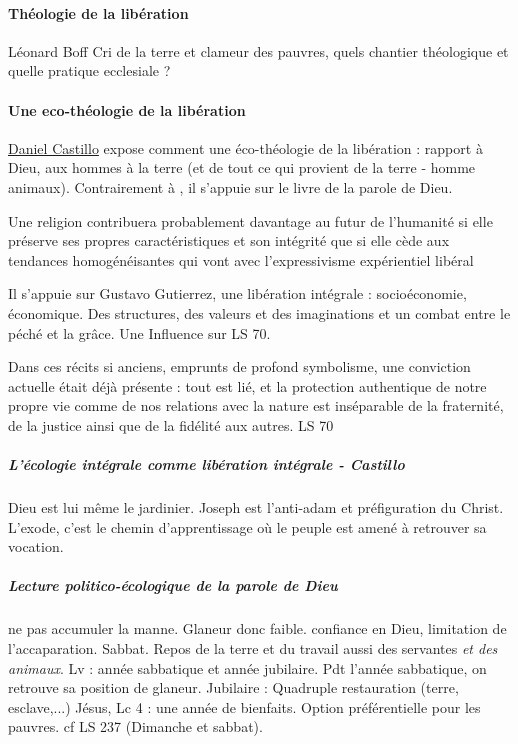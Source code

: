 \paragraph{Théologie de la libération} Léonard Boff
{Cri de la terre et clameur des pauvres, quels chantier théologique et quelle pratique ecclesiale ?} \cite{thomasset_recherche_2020}
 

\paragraph{Une eco-théologie de la libération} 
\href{https://www.loyola.edu/academics/theology/faculty/castillo}{Daniel Castillo} expose comment une éco-théologie  de la libération : rapport à Dieu, aux hommes à la terre (et de tout ce qui provient de la terre - homme animaux). Contrairement à , il s'appuie sur le livre de la parole de Dieu. 
\begin{singlequote}
    Une religion contribuera probablement davantage au futur de l’humanité si elle préserve ses propres caractéristiques et son intégrité que si elle cède aux tendances homogénéisantes qui vont avec l’expressivisme expérientiel libéral \cite[ p. 115]{lindbeck_nature_2002}
\end{singlequote}

Il s'appuie sur Gustavo Gutierrez, une libération intégrale : socioéconomie, économique. Des structures, des valeurs et des imaginations et un combat entre le péché et la grâce. Une Influence sur LS 70.
 
\begin{singlequote}
    Dans ces récits si anciens, emprunts de profond symbolisme, une conviction actuelle était déjà présente : tout est lié, et la protection authentique de notre propre vie comme de nos relations avec la nature est inséparable de la fraternité, de la justice ainsi que de la fidélité aux autres. LS 70
\end{singlequote}
 

\subparagraph{L'écologie intégrale comme libération intégrale - Castillo} 
 Dieu est lui même le jardinier. Joseph est l'anti-adam et préfiguration du Christ.  L'exode, c'est le chemin d'apprentissage où le peuple est amené à retrouver sa vocation. 

\subparagraph{Lecture politico-écologique de la parole de Dieu} ne pas accumuler la manne. Glaneur donc faible. confiance en Dieu, limitation de l'accaparation.
Sabbat. Repos de la terre et du travail aussi des servantes \textit{et des animaux}. Lv : année sabbatique et année jubilaire. Pdt l’année sabbatique, on retrouve sa position de glaneur. Jubilaire : Quadruple restauration (terre, esclave,...) Jésus, Lc 4 : une année de bienfaits. Option préférentielle
pour les pauvres. cf LS 237 (Dimanche et sabbat).




